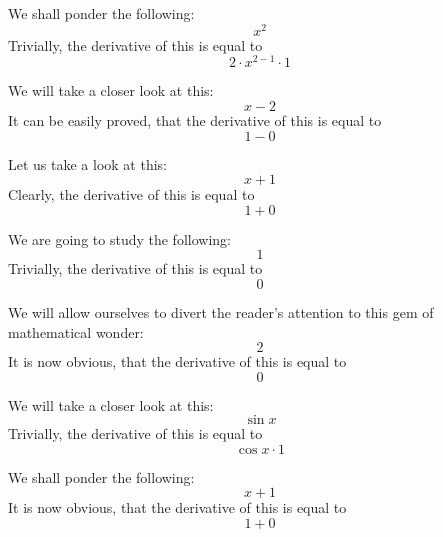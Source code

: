 \documentclass{article}
\begin{document}
We shall ponder the following:
\begin{equation}
x ^{2 } 
\end{equation}
Trivially, the derivative of this is equal to
\begin{equation}
2 \cdot x ^{2 - 1 } \cdot 1 
\end{equation}

We will take a closer look at this:
\begin{equation}
x - 2 
\end{equation}
It can be easily proved, that the derivative of this is equal to
\begin{equation}
1 - 0 
\end{equation}

Let us take a look at this:
\begin{equation}
x + 1 
\end{equation}
Clearly, the derivative of this is equal to
\begin{equation}
1 + 0 
\end{equation}

We are going to study the following:
\begin{equation}
1 
\end{equation}
Trivially, the derivative of this is equal to
\begin{equation}
0 
\end{equation}

We will allow ourselves to divert the reader's attention to this gem of mathematical wonder:
\begin{equation}
2 
\end{equation}
It is now obvious, that the derivative of this is equal to
\begin{equation}
0 
\end{equation}

We will take a closer look at this:
\begin{equation}
\sin x 
\end{equation}
Trivially, the derivative of this is equal to
\begin{equation}
\cos x \cdot 1 
\end{equation}

We shall ponder the following:
\begin{equation}
x + 1 
\end{equation}
It is now obvious, that the derivative of this is equal to
\begin{equation}
1 + 0 
\end{equation}
\end{document}
